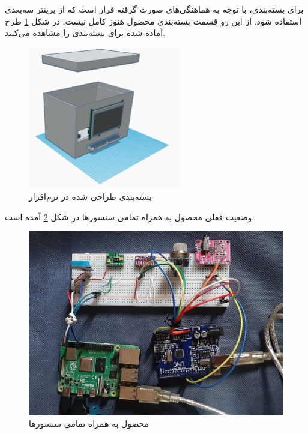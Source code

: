 برای بسته‌بندی، با توجه به هماهنگی‌های صورت گرفته قرار است که از پرینتر سه‌بعدی استفاده شود. از این رو قسمت بسته‌بندی محصول هنوز کامل نیست. در شکل \ref{fig:9} طرح آماده شده برای بسته‌بندی را مشاهده می‌کنید.

\begin{figure}[h]
	\centering
	\includegraphics[width=0.6\textwidth]{figs/package.png}
	
	\caption{بسته‌بندی طراحی شده در نرم‌افزار }
	\label{fig:9}
\end{figure}

وضعیت فعلی محصول به همراه تمامی سنسور‌ها در شکل \ref{fig:10} آمده است.


\begin{figure}[h]
	\centering
	\includegraphics[width=1.0\textwidth]{figs/all.jpg}
	
	\caption{محصول به همراه تمامی سنسور‌ها }
	\label{fig:10}
\end{figure}

